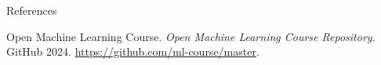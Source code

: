 \begin{frame}[allowframebreaks]{References}
\begin{thebibliography}{99}

Open Machine Learning Course. \emph{Open Machine Learning Course Repository.} GitHub 2024. \href{https://github.com/ml-course/master}{https://github.com/ml-course/master}.

\end{thebibliography}
\end{frame}